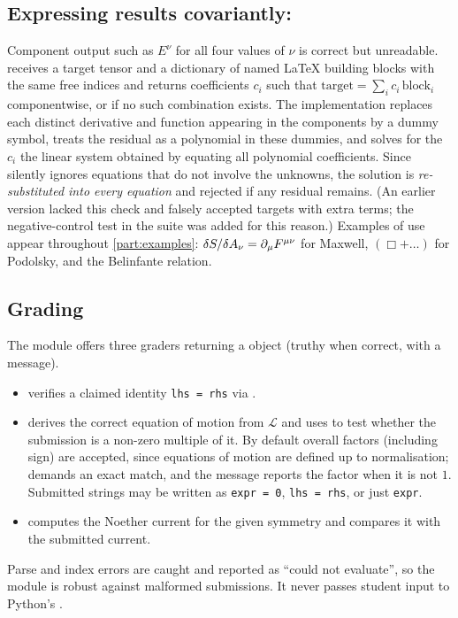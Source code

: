 \subsection{Expressing results covariantly: }
\label{sec:fit}

Component output such as $E^\nu$ for all four values of $\nu$ is correct but unreadable.  receives a target tensor and a dictionary of named \LaTeX{} building blocks with the same free indices and returns coefficients $c_i$ such that $\text{target}=\sum_ic_i\,\text{block}_i$ componentwise, or  if no such combination exists. The implementation replaces each distinct derivative and function appearing in the components by a dummy symbol, treats the residual as a polynomial in these dummies, and solves for the $c_i$ the linear system obtained by equating all polynomial coefficients. Since  silently ignores equations that do not involve the unknowns, the solution is \emph{re-substituted into every equation} and rejected if any residual remains. (An earlier version lacked this check and falsely accepted targets with extra terms; the negative-control test in the suite was added for this reason.) Examples of use appear throughout \cref{part:examples}: $\delta S/\delta A_\nu=\partial_\mu F^{\mu\nu}$ for Maxwell, $(\Box+\dots)$ for Podolsky, and the Belinfante relation.

\subsection{Grading}
\label{sec:grading}

The  module offers three graders returning a  object (truthy when correct, with a message).
\begin{itemize}[nosep]
\item {} verifies a claimed identity \texttt{lhs = rhs} via .
\item {} derives the correct equation of motion from $\mathcal L$ and uses  to test whether the submission is a non-zero multiple of it. By default overall factors (including sign) are accepted, since equations of motion are defined up to normalisation;  demands an exact match, and the message reports the factor when it is not $1$. Submitted strings may be written as \texttt{expr = 0}, \texttt{lhs = rhs}, or just \texttt{expr}.
\item {} computes the Noether current for the given symmetry and compares it with the submitted current.
\end{itemize}
Parse and index errors are caught and reported as ``could not evaluate'', so the module is robust against malformed submissions. It never passes student input to Python's .

